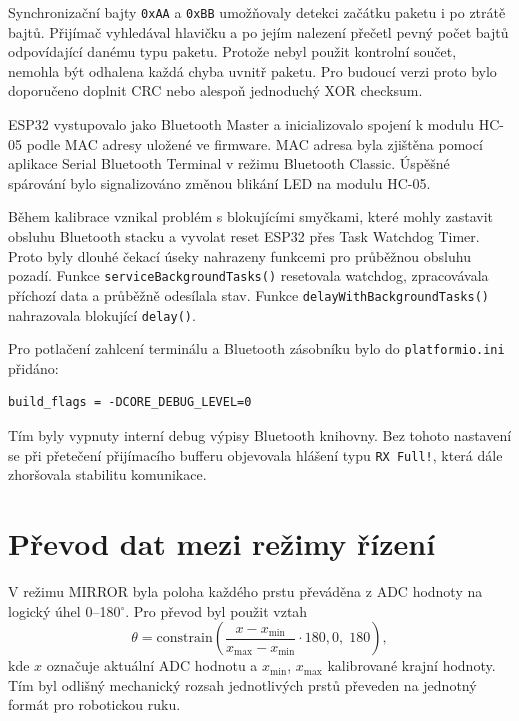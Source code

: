 Synchronizační bajty \texttt{0xAA} a \texttt{0xBB} umožňovaly detekci začátku paketu i po ztrátě bajtů. Přijímač vyhledával hlavičku a po jejím nalezení přečetl pevný počet bajtů odpovídající danému typu paketu. Protože nebyl použit kontrolní součet, nemohla být odhalena každá chyba uvnitř paketu. Pro budoucí verzi proto bylo doporučeno doplnit CRC nebo alespoň jednoduchý XOR checksum.

ESP32 vystupovalo jako Bluetooth Master a inicializovalo spojení k modulu HC-05 podle MAC adresy uložené ve firmware. MAC adresa byla zjištěna pomocí aplikace Serial Bluetooth Terminal v režimu Bluetooth Classic. Úspěšné spárování bylo signalizováno změnou blikání LED na modulu HC-05.

Během kalibrace vznikal problém s blokujícími smyčkami, které mohly zastavit obsluhu Bluetooth stacku a vyvolat reset ESP32 přes Task Watchdog Timer. Proto byly dlouhé čekací úseky nahrazeny funkcemi pro průběžnou obsluhu pozadí. Funkce \texttt{serviceBackgroundTasks()} resetovala watchdog, zpracovávala příchozí data a průběžně odesílala stav. Funkce \texttt{delayWithBackgroundTasks()} nahrazovala blokující \texttt{delay()}.

Pro potlačení zahlcení terminálu a Bluetooth zásobníku bylo do \texttt{platformio.ini} přidáno:

\begin{lstlisting}
build_flags = -DCORE_DEBUG_LEVEL=0
\end{lstlisting}

Tím byly vypnuty interní debug výpisy Bluetooth knihovny. Bez tohoto nastavení se při přetečení přijímacího bufferu objevovala hlášení typu \texttt{RX Full!}, která dále zhoršovala stabilitu komunikace.

\section{Převod dat mezi režimy řízení}
\label{sec:prevod-dat-rezimy}

V režimu MIRROR byla poloha každého prstu převáděna z ADC hodnoty na logický úhel 0--180$^\circ$. Pro převod byl použit vztah
\begin{equation}
    \theta = \mathrm{constrain}\!\left(
        \frac{x - x_{\min}}{x_{\max} - x_{\min}} \cdot 180,
        0,\;180
    \right),
\end{equation}
kde $x$ označuje aktuální ADC hodnotu a $x_{\min}$, $x_{\max}$ kalibrované krajní hodnoty. Tím byl odlišný mechanický rozsah jednotlivých prstů převeden na jednotný formát pro robotickou ruku.

